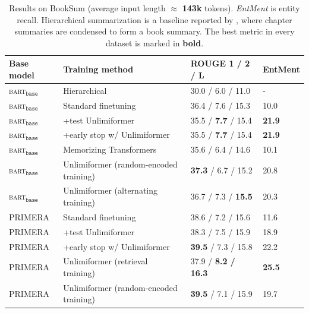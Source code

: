 \documentclass{article}
\newcommand{\ours}{Unlimiformer\xspace}
\begin{document}
\begin{table}[h!]
\centering
\begin{tabular}{llll}
\toprule
Base model & Training method       &      ROUGE 1 / 2 / L & EntMent \\ 
\midrule
\textsc{bart}$_{\texttt{base}}$       & Hierarchical \citep{booksum} &  30.0 / 6.0 / 11.0 & -
\\

\textsc{bart}$_{\texttt{base}}$       & Standard finetuning  &  36.4 / 7.6 / 15.3 & 10.0 \\
\textsc{bart}$_{\texttt{base}}$       & \qquad+test \ours   & 35.5 / \textbf{7.7} / 15.4 & \textbf{21.9} \\
\textsc{bart}$_{\texttt{base}}$       & \qquad+early stop w/  \ours   & 35.5 / \textbf{7.7} / 15.4 & \textbf{21.9} \\
\textsc{bart}$_{\texttt{base}}$       & Memorizing Transformers                       &    35.6 / 6.4 / 14.6 & 10.1 \\

\textsc{bart}$_{\texttt{base}}$       & Unlimiformer (random-encoded training)                        &    \textbf{37.3} / 6.7 / 15.2 & 20.8 \\
\textsc{bart}$_{\texttt{base}}$       & Unlimiformer (alternating training)                          &           36.7 / 7.3 / \textbf{15.5} & 20.3                                       \\ 
\midrule
\textsc{PRIMERA}    & Standard finetuning          &   38.6 / 7.2 / 15.6 & 11.6    %
                                                                         \\
\textsc{PRIMERA}    & \qquad+test \ours{}                   &      38.3 / 7.5 / 15.9 & 18.9 %
\\
\textsc{PRIMERA}    & \qquad+early stop w/  \ours &    \textbf{39.5} / 7.3 / 15.8 & 22.2                                           \\
\textsc{PRIMERA}    & \ours{} (retrieval training)              &              37.9 / \textbf{8.2 / 16.3} & \textbf{25.5}                                  \\
\textsc{PRIMERA}    & \ours{} (random-encoded training)                       &     \textbf{39.5} / 7.1 / 15.9 & 19.7                                           \\
\bottomrule
\end{tabular}                                   
\caption{Results on BookSum (average input length $\approx$ \textbf{143k} tokens). \textit{EntMent} is entity recall.
Hierarchical summarization is a baseline reported by \citet{booksum}, where chapter summaries are condensed to form a book summary.
The best metric in every dataset is marked in \textbf{bold}.
}
\label{tab:large-datasets}
\end{table}
\end{document}
